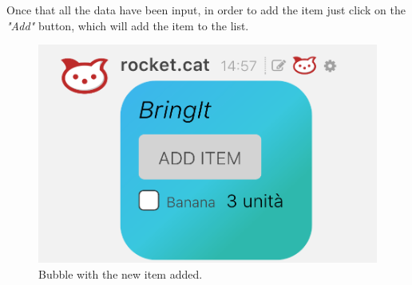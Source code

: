 Once that all the data have been input, in order to add the item just click on the \textit{"Add"} button, which will add the item to the list.

\begin{figure}[H]
  \centering 
  \includegraphics[scale=0.3]{Sections/3-HowToUse/Images/bubble_with_item.png}
  \caption{Bubble with the new item added.}
\end{figure}